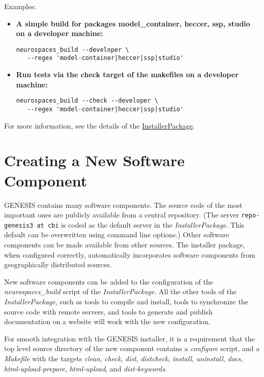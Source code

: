 \documentclass[12pt]{article}
\begin{document}
Examples:

\begin{itemize}

\item {\bf A simple build for packages model\_container, heccer, ssp, studio on a developer machine:}
\begin{verbatim}
neurospaces_build --developer \
   --regex 'model-container|heccer|ssp|studio'
\end{verbatim}

\item {\bf Run tests via the check target of the makefiles on a developer machine:}
\begin{verbatim}
neurospaces_build --check --developer \
   --regex 'model-container|heccer|ssp|studio'
\end{verbatim}
\end{itemize}

For more information, see the details of the \href{../installerpackage/installerpackage.tex}{InstallerPackage}. 

\section*{Creating a New Software Component}

GENESIS contains many software components. The source code of the most important ones are publicly available from a central repository. (The server {\tt repo-genesis3 at cbi} is coded as the default server in the {\it InstallerPackage}. This default can be overwritten using command line options.) Other software components can be made available from other sources. The installer package, when configured correctly, automatically incorporates software components from geographically distributed sources.

New software components can be added to the configuration of the {\it neurospaces\_build} script of the {\it InstallerPackage}. All the other tools of the {\it InstallerPackage}, such as tools to compile and install, tools to synchronize the source code with remote servers, and tools to generate and publish documentation on a website will work with the new configuration.

For smooth integration with the GENESIS installer, it is a requirement that the top level source directory of the new component contains a {\it configure} script, and a {\it Makefile} with the targets {\it clean}, {\it check}, {\it dist}, {\it distcheck}, {\it install}, {\it uninstall}, {\it docs}, {\it html-upload-prepare}, {\it html-upload}, and {\it dist-keywords}.
\end{document}
